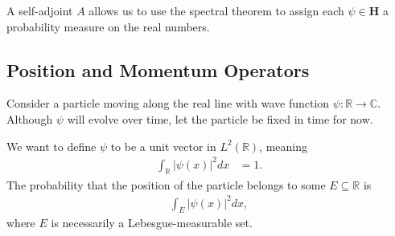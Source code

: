 \documentclass[12pt]{extarticle}
\newcommand{\R}{\mathbb{R}}
\newcommand{\C}{\mathbb{C}}
\theoremstyle{plain}
\theoremstyle{definition}
\theoremstyle{remark}
\renewcommand{\newline}{\hfill\break}
\begin{document}
  A self-adjoint $A$ allows us to use the spectral theorem to assign each $\psi \in \mathbf{H}$ a probability measure on the real numbers.
  \subsection{Position and Momentum Operators}%
  Consider a particle moving along the real line with wave function $\psi: \R\rightarrow \C$. Although $\psi$ will evolve over time, let the particle be fixed in time for now.\newline

  We want to define $\psi$ to be a unit vector in $L^{2}(\R)$, meaning
  \begin{align*}
    \int_{\R}\left\vert \psi(x) \right\vert^2dx &= 1.
  \end{align*}
  The probability that the position of the particle belongs to some $E\subseteq \R$ is
  \begin{align*}
    \int_{E}\left\vert \psi(x) \right\vert^2dx,
  \end{align*}
  where $E$ is necessarily a Lebesgue-measurable set.\newline
\end{document}
